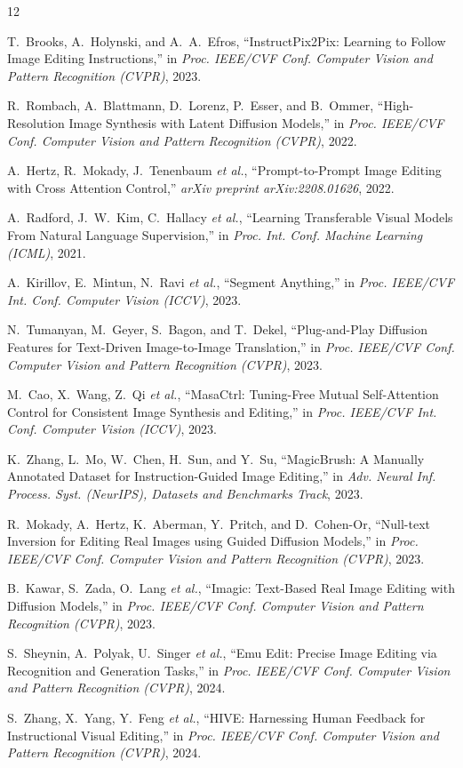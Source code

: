 \vspace{-4pt}
\small
\begin{thebibliography}{12}

T.~Brooks, A.~Holynski, and A.~A.~Efros, ``InstructPix2Pix: Learning to Follow Image Editing Instructions,'' in \textit{Proc. IEEE/CVF Conf. Computer Vision and Pattern Recognition (CVPR)}, 2023.

R.~Rombach, A.~Blattmann, D.~Lorenz, P.~Esser, and B.~Ommer, ``High-Resolution Image Synthesis with Latent Diffusion Models,'' in \textit{Proc. IEEE/CVF Conf. Computer Vision and Pattern Recognition (CVPR)}, 2022.

A.~Hertz, R.~Mokady, J.~Tenenbaum \textit{et al.}, ``Prompt-to-Prompt Image Editing with Cross Attention Control,'' \textit{arXiv preprint arXiv:2208.01626}, 2022.

A.~Radford, J.~W.~Kim, C.~Hallacy \textit{et al.}, ``Learning Transferable Visual Models From Natural Language Supervision,'' in \textit{Proc. Int. Conf. Machine Learning (ICML)}, 2021.

A.~Kirillov, E.~Mintun, N.~Ravi \textit{et al.}, ``Segment Anything,'' in \textit{Proc. IEEE/CVF Int. Conf. Computer Vision (ICCV)}, 2023.

N.~Tumanyan, M.~Geyer, S.~Bagon, and T.~Dekel, ``Plug-and-Play Diffusion Features for Text-Driven Image-to-Image Translation,'' in \textit{Proc. IEEE/CVF Conf. Computer Vision and Pattern Recognition (CVPR)}, 2023.

M.~Cao, X.~Wang, Z.~Qi \textit{et al.}, ``MasaCtrl: Tuning-Free Mutual Self-Attention Control for Consistent Image Synthesis and Editing,'' in \textit{Proc. IEEE/CVF Int. Conf. Computer Vision (ICCV)}, 2023.

K.~Zhang, L.~Mo, W.~Chen, H.~Sun, and Y.~Su, ``MagicBrush: A Manually Annotated Dataset for Instruction-Guided Image Editing,'' in \textit{Adv. Neural Inf. Process. Syst. (NeurIPS), Datasets and Benchmarks Track}, 2023.

R.~Mokady, A.~Hertz, K.~Aberman, Y.~Pritch, and D.~Cohen-Or, ``Null-text Inversion for Editing Real Images using Guided Diffusion Models,'' in \textit{Proc. IEEE/CVF Conf. Computer Vision and Pattern Recognition (CVPR)}, 2023.

B.~Kawar, S.~Zada, O.~Lang \textit{et al.}, ``Imagic: Text-Based Real Image Editing with Diffusion Models,'' in \textit{Proc. IEEE/CVF Conf. Computer Vision and Pattern Recognition (CVPR)}, 2023.

S.~Sheynin, A.~Polyak, U.~Singer \textit{et al.}, ``Emu Edit: Precise Image Editing via Recognition and Generation Tasks,'' in \textit{Proc. IEEE/CVF Conf. Computer Vision and Pattern Recognition (CVPR)}, 2024.

S.~Zhang, X.~Yang, Y.~Feng \textit{et al.}, ``HIVE: Harnessing Human Feedback for Instructional Visual Editing,'' in \textit{Proc. IEEE/CVF Conf. Computer Vision and Pattern Recognition (CVPR)}, 2024.

\end{thebibliography}
